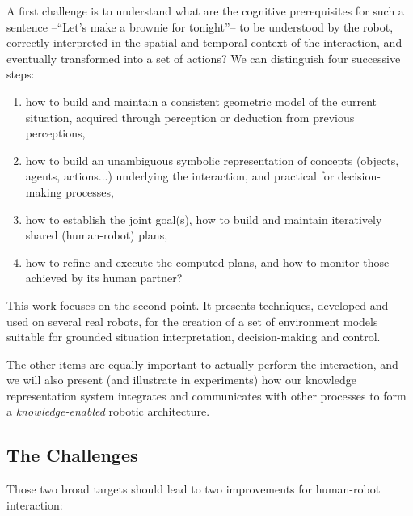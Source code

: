 A first challenge is to understand what are the cognitive prerequisites for
such a sentence --``Let's make a brownie for tonight''-- to be understood by
the robot, correctly interpreted in the spatial and temporal context of the
interaction, and eventually transformed into a set of actions? We can
distinguish four successive steps:

\begin{enumerate}

    \item how to build and maintain a consistent geometric model of the current
    situation, acquired through perception or deduction from previous
    perceptions,

    \item how to build an unambiguous symbolic representation of concepts
    (objects, agents, actions...) underlying the interaction, and practical for
    decision-making processes,

    \item how to establish the joint goal(s), how to build and maintain
    iteratively shared (human-robot) plans, 

    \item how to refine and execute the computed plans, and how to monitor
    those achieved by its human partner?

\end{enumerate}


This work focuses on the second point. It presents techniques, developed and
used on several real robots, for the creation of a set of environment models
suitable for grounded situation interpretation, decision-making and control.

The other items are equally important to actually perform the interaction, and
we will also present (and illustrate in experiments) how our knowledge
representation system integrates and communicates with other processes to form
a \emph{knowledge-enabled} robotic architecture.






\subsection{The Challenges}


Those two broad targets should lead to two improvements for human-robot
interaction:


